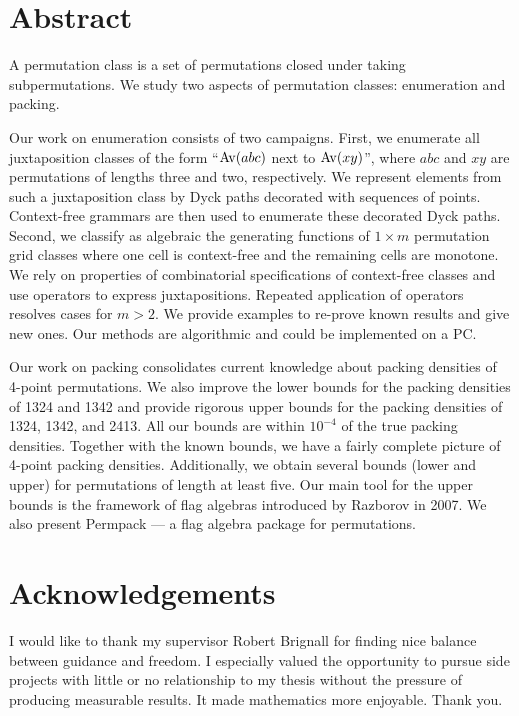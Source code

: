 \documentclass[12pt, a4paper, twoside]{report}
\begin{document}



\afterpage{\null\newpage}

\setcounter{secnumdepth}{-3}%
\chapter{Abstract}
A permutation class is a set of permutations closed under taking subpermutations. We study two aspects of permutation classes: enumeration and packing.

Our work on enumeration consists of two campaigns. First, we enumerate all juxtaposition classes of the form ``$\mathrm{Av}(abc)$ next to $\mathrm{Av}(xy)$'', where $abc$ and $xy$ are permutations of lengths three and two, respectively. We represent elements from such a juxtaposition class by Dyck paths decorated with sequences of points. Context-free grammars are then used to enumerate these decorated Dyck paths. Second, we classify as algebraic the generating functions of $1\times m$ permutation grid classes where one cell is context-free and the remaining cells are monotone. We rely on properties of combinatorial specifications of context-free classes and use operators to express juxtapositions. Repeated application of operators resolves cases for $m>2$. We provide examples to re-prove known results and give new ones. Our methods are algorithmic and could be implemented on a PC.

Our work on packing consolidates current knowledge about packing densities of 4-point permutations. We also improve the lower bounds for the packing densities of 1324 and 1342 and provide rigorous upper bounds for the packing densities of 1324, 1342, and 2413. All our bounds are within $10^{-4}$ of the true packing densities. Together with the known bounds, we have a fairly complete picture of 4-point packing densities. Additionally, we obtain several bounds (lower and upper) for permutations of length at least five. Our main tool for the upper bounds is the framework of flag algebras introduced by Razborov in 2007. We also present Permpack --- a flag algebra package for permutations. 
\afterpage{\null\newpage}

\chapter{Acknowledgements}
I would like to thank my supervisor Robert Brignall for finding nice balance between guidance and freedom. I especially valued the opportunity to pursue side projects with little or no relationship to my thesis without the pressure of producing measurable results. It made mathematics more enjoyable. Thank you.
\end{document}

